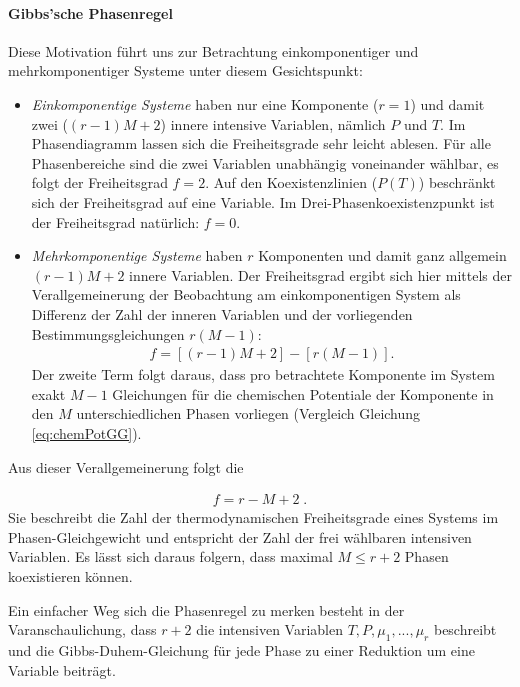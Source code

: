 \paragraph*{Gibbs'sche Phasenregel} Diese Motivation führt uns zur Betrachtung einkomponentiger und mehrkomponentiger Systeme unter diesem Gesichtspunkt:
\begin{itemize}
    \item \emph{Einkomponentige Systeme} haben nur eine Komponente ($r=1$) und damit zwei ($\left(r-1\right)M+2$) innere intensive Variablen, nämlich $P$ und $T$.
    Im Phasendiagramm lassen sich die Freiheitsgrade sehr leicht ablesen. Für alle Phasenbereiche sind die zwei Variablen unabhängig voneinander wählbar, es folgt der Freiheitsgrad $f=2$. Auf den Koexistenzlinien ($P(T)$) beschränkt sich der Freiheitsgrad auf eine Variable. Im Drei-Phasenkoexistenzpunkt ist der Freiheitsgrad natürlich: $f=0$.
    \item \emph{Mehrkomponentige Systeme} haben $r$ Komponenten und damit ganz allgemein $\left(r-1\right)M+2$ innere Variablen. Der Freiheitsgrad ergibt sich hier mittels der Verallgemeinerung der Beobachtung am einkomponentigen System als Differenz der Zahl der inneren Variablen und der vorliegenden Bestimmungsgleichungen $r\left(M-1\right)$: 
    \begin{align*}
        f=\left[\left(r-1\right)M+2\right]-\left[r\left(M-1\right)\right].
    \end{align*}
    Der zweite Term folgt daraus, dass pro betrachtete Komponente im System exakt $M-1$ Gleichungen für die chemischen Potentiale der Komponente in den $M$ unterschiedlichen Phasen vorliegen (Vergleich Gleichung \ref{eq:chemPotGG}).
\end{itemize}
Aus dieser Verallgemeinerung folgt die 
\begin{formal}
    \begin{align*}
        \boxed{f=r-M+2}\;.
    \end{align*}
    Sie beschreibt die Zahl der thermodynamischen Freiheitsgrade eines Systems im Phasen-Gleichgewicht und entspricht der Zahl der frei wählbaren intensiven Variablen. Es lässt sich daraus folgern, dass maximal $M\leq r+2$ Phasen koexistieren können. 
\end{formal}
Ein einfacher Weg sich die Phasenregel zu merken besteht in der Varanschaulichung, dass $r+2$ die intensiven Variablen $T,P,\mu_1,...,\mu_r$ beschreibt und die Gibbs-Duhem-Gleichung für jede Phase zu einer Reduktion um eine Variable beiträgt. 

